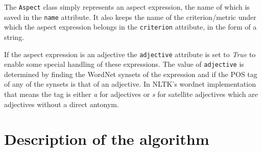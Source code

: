 The \texttt{Aspect} class simply represents an aspect expression, the name of which is saved in the \texttt{name} attribute. It also keeps the name of the criterion/metric under which the aspect expression belongs in the \texttt{criterion} attribute, in the form of a string. 

If the aspect expression is an adjective the \texttt{adjective} attribute is set to \textit{True} to enable some special handling of these expressions. The value of \texttt{adjective} is determined by finding the WordNet synsets of the expression and if the POS tag of any of the synsets is that of an adjective. In NLTK's wordnet implementation that means the tag is either \textit{a} for adjectives or \textit{s} for satellite adjectives which are adjectives without a direct antonym.

\section{Description of the algorithm}
